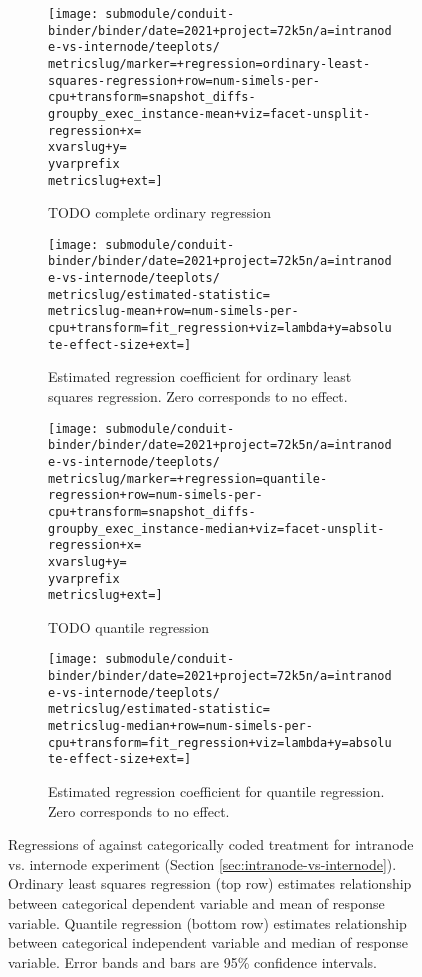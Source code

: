 \begin{figure*}
  \centering

  \begin{subfigure}[b]{0.5\textwidth}
    \centering
    \texttt{[image: submodule/conduit-binder/binder/date=2021+project=72k5n/a=intranode-vs-internode/teeplots/\\metricslug/marker=+regression=ordinary-least-squares-regression+row=num-simels-per-cpu+transform=snapshot\_diffs-groupby\_exec\_instance-mean+viz=facet-unsplit-regression+x=\\xvarslug+y=\\yvarprefix\\metricslug+ext=]}
    \caption{TODO complete ordinary regression}
    \label{fig:intranode-vs-internode-regression-ols-\metricslug-complete-regression}
  \end{subfigure}%
  \begin{subfigure}[b]{0.5\textwidth}
    \centering
    \texttt{[image: submodule/conduit-binder/binder/date=2021+project=72k5n/a=intranode-vs-internode/teeplots/\\metricslug/estimated-statistic=\\metricslug-mean+row=num-simels-per-cpu+transform=fit\_regression+viz=lambda+y=absolute-effect-size+ext=]}
    \caption{Estimated regression coefficient for ordinary least squares regression. Zero corresponds to no effect.}
    \label{fig:intranode-vs-internode-regression-ols-\metricslug-complete-effect-size}
  \end{subfigure}

  \begin{subfigure}[b]{0.5\textwidth}
    \centering
    \texttt{[image: submodule/conduit-binder/binder/date=2021+project=72k5n/a=intranode-vs-internode/teeplots/\\metricslug/marker=+regression=quantile-regression+row=num-simels-per-cpu+transform=snapshot\_diffs-groupby\_exec\_instance-median+viz=facet-unsplit-regression+x=\\xvarslug+y=\\yvarprefix\\metricslug+ext=]}
    \caption{TODO quantile regression}
    \label{fig:intranode-vs-internode-regression-quantile-\metricslug-complete-regression}
  \end{subfigure}%
  \begin{subfigure}[b]{0.5\textwidth}
    \centering
    \texttt{[image: submodule/conduit-binder/binder/date=2021+project=72k5n/a=intranode-vs-internode/teeplots/\\metricslug/estimated-statistic=\\metricslug-median+row=num-simels-per-cpu+transform=fit\_regression+viz=lambda+y=absolute-effect-size+ext=]}
    \caption{Estimated regression coefficient for quantile regression. Zero corresponds to no effect.}
    \label{fig:intranode-vs-internode-regression-quantile-\metricslug-complete-effect-size}
  \end{subfigure}

  \caption{
  Regressions of \metric{} against categorically coded treatment for intranode vs. internode experiment (Section \ref{sec:intranode-vs-internode}).
  Ordinary least squares regression (top row) estimates relationship between categorical dependent variable and mean of response variable.
  Quantile regression (bottom row) estimates relationship between categorical independent variable and median of response variable.
  Error bands and bars are 95\% confidence intervals.
  }
  \label{fig:intranode-vs-internode-regression-\metricslug}
\end{figure*}
